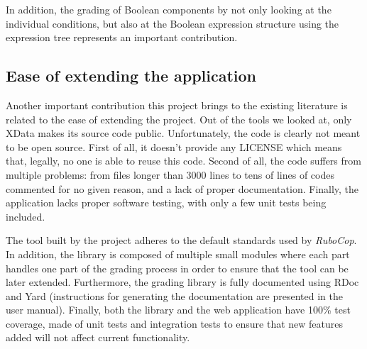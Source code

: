 In addition, the grading of Boolean components by not only looking at the individual conditions, but also at the Boolean expression structure using the expression tree represents an important contribution.

\subsection{Ease of extending the application}
Another important contribution this project brings to the existing literature is related to the ease of extending the project. Out of the tools we looked at, only XData makes its source code public. Unfortunately, the code is clearly not meant to be open source. First of all, it doesn't provide any LICENSE which means that, legally, no one is able to reuse this code. Second of all, the code suffers from multiple problems: from files longer than 3000 lines to tens of lines of codes commented for no given reason, and a lack of proper documentation. Finally, the application lacks proper software testing, with only a few unit tests being included.

The tool built by the project adheres to the default standards used by \textit{RuboCop}. In addition, the library is composed of multiple small modules where each part handles one part of the grading process in order to ensure that the tool can be later extended. Furthermore, the grading library is fully documented using RDoc and Yard (instructions for generating the documentation are presented in the user manual). Finally, both the library and the web application have 100\% test coverage, made of unit tests and integration tests to ensure that new features added will not affect current functionality.

